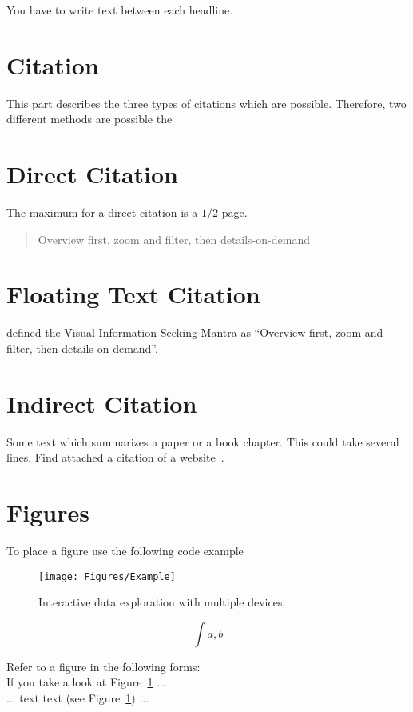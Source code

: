 You have to write text between each headline.

\section{Citation}

This part describes the three types of citations which are possible. Therefore, two different methods are possible the 


\section{Direct Citation}

The maximum for a direct citation is a ${1/2}$ page.

\begin{quotation}
	Overview first, zoom and filter, then details-on-demand
	\autocite{shneiderman_eyes_1996}
    \end{quotation}

\section{Floating Text Citation}

\textcite{shneiderman_eyes_1996} defined the Visual Information Seeking Mantra as ``Overview first, zoom and filter, then details-on-demand''. 
\section{Indirect Citation}

Some text which summarizes a paper or a book chapter. This could take several lines.
Find attached a citation of a website~\autocite{kaley_match_2018}.

\newpage
\section{Figures}

To place a figure use the following code example

\begin{figure}[ht!]
  \centering
  \texttt{[image: Figures/Example]}
  \caption{Interactive data exploration with multiple devices.}
  \label{fig:example}
\end{figure}

$$\int{a,b}$$



Refer to a figure in the following forms:\\
If you take a look at Figure~\ref{fig:example} ...\\
... text text (see Figure~\ref{fig:example}) ...

